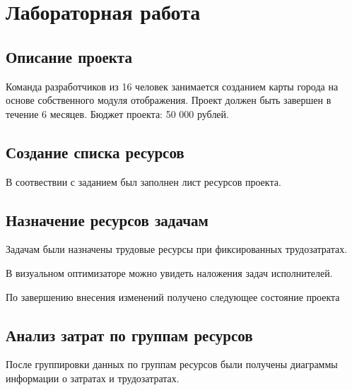 \chapter{Лабораторная работа}

\section{Описание проекта}

Команда разработчиков из 16 человек занимается созданием карты города на основе собственного модуля отображения. Проект должен быть завершен в течение 6 месяцев. Бюджет проекта: 50 000 рублей.

\section{Создание списка ресурсов}

В соотвествии с заданием был заполнен лист ресурсов проекта.


\section{Назначение ресурсов задачам}

Задачам были назначены трудовые ресурсы при фиксированных трудозатратах.


В визуальном оптимизаторе можно увидеть наложения задач исполнителей.


По завершению внесения изменений получено следующее состояние проекта

\section{Анализ затрат по группам ресурсов}

После группировки данных по группам ресурсов были получены диаграммы информации о затратах и трудозатратах.

\clearpage


